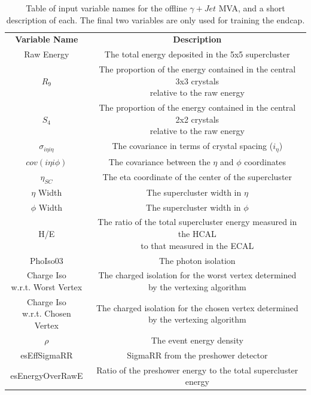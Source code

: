 \documentclass[12pt]{ucsddissertation}
\begin{document}
\begin{table}
	\centering
	\caption{Table of input variable names for the offline $\gamma + Jet$ MVA, and a short description of each. The final two variables are only used for training the endcap.}
	\label{tab:OfflineSinglePhoInputVars}
	\begin{tabular}{ | c | c | } 
		\hline
		\textbf{Variable Name} & \textbf{Description} \\
		\Xhline{2pt}
	  	Raw Energy & The total energy deposited in the 5x5 supercluster  \\ 
		\hline
		$R_{9}$ & \makecell{The proportion of the energy contained in the central 3x3 crystals \\ relative to the raw energy}  \\ 
		\hline
		$S_{4}$ & \makecell{The proportion of the energy contained in the central 2x2 crystals \\ relative to the raw energy}  \\ 
		\hline
		$\sigma_{i \eta i \eta}$ & The covariance in terms of crystal spacing ($i_{\eta}$)\\ 
		\hline
		$cov(i \eta i \phi)$ & The covariance between the $\eta$ and $\phi$ coordinates\\ 
		\hline
		$\eta_{SC}$ & The eta coordinate of the center of the supercluster  \\ 
		\hline
		$\eta$ Width &  The supercluster width in $\eta$ \\ 
		\hline
		$\phi$ Width &  The supercluster width in $\phi$ \\ 
		\hline
		H/E & \makecell{The ratio of the total supercluster energy measured in the HCAL \\ to that measured in the ECAL}  \\ 
		\hline
		PhoIso03 & The photon isolation\\ 
		\hline
		\makecell{Charge Iso \\ w.r.t. Worst Vertex} & \makecell{The charged isolation for the worst vertex determined \\ by the vertexing algorithm}\\ 
		\hline
		\makecell{Charge Iso \\ w.r.t. Chosen Vertex} & \makecell{The charged isolation for the chosen vertex determined \\ by the vertexing algorithm}\\ 
		\hline
		$\rho$ & The event energy density\\ 
		\hline
		\hline
		esEffSigmaRR & SigmaRR from the preshower detector\\ 
		\hline
		esEnergyOverRawE & Ratio of the preshower energy to the total supercluster energy\\ 
		\hline
	\end{tabular}
\end{table}
\end{document}
